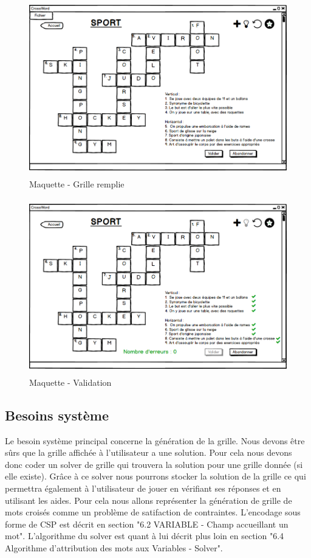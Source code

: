 \documentclass [ 11 pt ] {article}
\begin{document}
    \begin{figure}[H]
    \begin{center}
        \includegraphics[height=3in]{Maquettes/Grille_remplie.png}
        \caption{Maquette - Grille remplie} 
    \end{center}
    \end{figure}
    
      \begin{figure}[H]
    \begin{center}
        \includegraphics[height=3in]{Maquettes/Grille_validation.png}
        \caption{Maquette - Validation} 
    \end{center}
    \end{figure}

\subsection{Besoins système}
Le besoin système principal concerne la génération de la grille. Nous devons être sûrs que la grille affichée à l'utilisateur a une solution. Pour cela nous devons donc coder un solver de grille qui trouvera la solution pour une grille donnée (si elle existe). Grâce à ce solver nous pourrons stocker la solution de la grille ce qui permettra également à l'utilisateur de jouer en vérifiant ses réponses et en utilisant les aides. Pour cela nous allons représenter la génération de grille de mots croisés comme un problème de satifaction de contraintes.  
L'encodage sous forme de CSP est décrit en section "6.2 VARIABLE - Champ accueillant un mot".
L'algorithme du solver est quant à lui décrit plus loin en section "6.4 Algorithme d'attribution des mots aux Variables - Solver".
\end{document}

